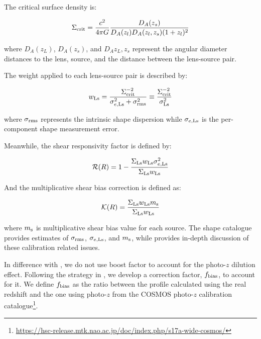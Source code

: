 \documentclass[fleqn,usenatbib,useAMS]{mnras}
\begin{document}
\begin{CJK*}{UTF8}{gbsn}
    The critical surface density is:

    \begin{equation}
        \Sigma_{\rm crit}=\frac{c^2}{4\pi G} \frac{D_A(z_s)}{D_A(z_l) D_A(z_l, z_s) (1+z_l)^2}
        \label{eq:sigcrit}
    \end{equation}

    \noindent where $D_A(z_L)$, $D_A(z_s)$, and $D_A{z_L, z_s}$ represent the angular diameter
    distances to the lens, source, and the distance between the lens-source pair.

    The weight applied to each lens-source pair is described by:

    \begin{equation}
        w_{\rm Ls} = \frac{\Sigma_{\rm crit}^{-2}}{\sigma^2_{e, {\rm Ls}} + \sigma^2_{\rm rms}}
            \equiv \frac{\Sigma_{\rm crit}^{-2}}{\sigma^2_{{\rm Ls}}}
        \label{eq:weight}
    \end{equation}

    \noindent where $\sigma_{\rm rms}$ represents the intrinsic shape dispersion while
    $\sigma_{e, \rm Ls}$ is the per-component shape measurement error.

    Meanwhile, the shear responsivity factor is defined by:

    \begin{equation}
        \mathcal{R}(R) = 1 - \frac{\Sigma_{\rm Ls} w_{\rm Ls} \sigma^2_{e, {\rm Ls}}}{\Sigma_{\rm Ls} w_{\rm Ls}}
        \label{eq:rfactor}
    \end{equation}

    \noindent And the multiplicative shear bias correction is defined as:

    \begin{equation}
        \mathcal{K}(R) = \frac{\Sigma_{\rm Ls} w_{\rm Ls} m_{\rm s}}{\Sigma_{\rm Ls} w_{\rm Ls}}
        \label{eq:kfactor}
    \end{equation}

    \noindent where $m_{\rm s}$ is multiplicative shear bias value for each source.
    The shape catalogue provides estimates of $\sigma_{\rm rms}$, $\sigma_{e, \rm Ls}$, and $m_{\rm
    s}$, while \citet{HSC-WLCALIB} provides in-depth discussion of these calibration related
    issues.

    In difference with \citet{Singh2017}, we do not use boost factor to account for the photo-$z$
    dilution effect.
    Following the strategy in \citet{Leauthaud2017}, we develop a correction
    factor, $f_{\rm bias}$, to account for it.
    We define $f_{\rm bias}$ as the ratio between the \dsigma{} profile calculated using
    the real redshift and the one using photo-$z$ from the COSMOS photo-$z$ calibration
    catalogue\footnote{
    \url{https://hsc-release.mtk.nao.ac.jp/doc/index.php/s17a-wide-cosmos/}}.


\end{CJK*}
\end{document}
